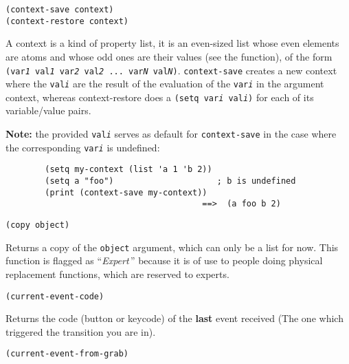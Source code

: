         
{\usagefont\begin{verbatim}
(context-save context)
(context-restore context)
\end{verbatim}}\usageupspace

A context is a kind of property list, it is an even-sized list whose even
elements are atoms and whose odd ones are their values (see the 
function), of the form {\tt (var{\it 1} val{\it 1} var{\it 2} val{\it 2} ...
var{\it N} val{\it N})}. \verb"context-save" creates a new context
where the {\tt val{\it i}} are the result of the evaluation of the
{\tt var{\it i}} in the argument context, whereas context-restore does
a {\tt (setq var{\it i} val{\it i})} for each of its variable/value pairs.

{\bf Note:} the provided {\tt val{\it i}} serves as default for
\verb"context-save" in the case where the corresponding {\tt var{\it i}} is
undefined:

{\exemplefont\begin{verbatim}
        (setq my-context (list 'a 1 'b 2))
        (setq a "foo")                     ; b is undefined
        (print (context-save my-context))
                                        ==>  (a foo b 2)
\end{verbatim}}


{\usagefont\begin{verbatim}
(copy object)
\end{verbatim}}\usageupspace

Returns a copy of the \verb"object" argument, which can only be a list for
now. This function is flagged as ``{\em Expert}\,'' because it is of use
to people doing physical replacement functions, which are reserved to
experts.

        
{\usagefont\begin{verbatim}
(current-event-code)
\end{verbatim}}\usageupspace

Returns the code (button or keycode) of the {\bf last} event received (The
one which triggered the transition you are in).

        
{\usagefont\begin{verbatim}
(current-event-from-grab)
\end{verbatim}}\usageupspace

